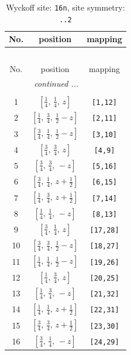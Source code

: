 \documentclass[fleqn,8pt]{jsarticle}
\begin{document}
\renewcommand{\arraystretch}{1.2}
\begin{longtable}{ccc}
\caption{Wyckoff site: {\tt 16n}, site symmetry: {\tt ..2}}
 \\
 \hline \hline
No. & position & mapping \\ \hline \endfirsthead

\multicolumn{2}{l}{\tablename\ \thetable{}} \\
 \hline \hline
No. & position & mapping \\ \hline \endhead

 \hline \hline
\multicolumn{2}{r}{\footnotesize\it continued ...} \\ \endfoot

 \hline \hline
\multicolumn{2}{r}{} \\ \endlastfoot

1 & $\left[ \frac{1}{4},\, \frac{1}{4},\, z \right]$ & {\tt [1,12]} \\ \hline
2 & $\left[ \frac{1}{4},\, \frac{3}{4},\, \frac{1}{2} - z \right]$ & {\tt [2,11]} \\ \hline
3 & $\left[ \frac{3}{4},\, \frac{1}{4},\, \frac{1}{2} - z \right]$ & {\tt [3,10]} \\ \hline
4 & $\left[ \frac{3}{4},\, \frac{3}{4},\, z \right]$ & {\tt [4,9]} \\ \hline
5 & $\left[ \frac{3}{4},\, \frac{3}{4},\, - z \right]$ & {\tt [5,16]} \\ \hline
6 & $\left[ \frac{3}{4},\, \frac{1}{4},\, z + \frac{1}{2} \right]$ & {\tt [6,15]} \\ \hline
7 & $\left[ \frac{1}{4},\, \frac{3}{4},\, z + \frac{1}{2} \right]$ & {\tt [7,14]} \\ \hline
8 & $\left[ \frac{1}{4},\, \frac{1}{4},\, - z \right]$ & {\tt [8,13]} \\ \hline
9 & $\left[ \frac{3}{4},\, \frac{1}{4},\, z \right]$ & {\tt [17,28]} \\ \hline
10 & $\left[ \frac{3}{4},\, \frac{3}{4},\, \frac{1}{2} - z \right]$ & {\tt [18,27]} \\ \hline
11 & $\left[ \frac{1}{4},\, \frac{1}{4},\, \frac{1}{2} - z \right]$ & {\tt [19,26]} \\ \hline
12 & $\left[ \frac{1}{4},\, \frac{3}{4},\, z \right]$ & {\tt [20,25]} \\ \hline
13 & $\left[ \frac{1}{4},\, \frac{3}{4},\, - z \right]$ & {\tt [21,32]} \\ \hline
14 & $\left[ \frac{1}{4},\, \frac{1}{4},\, z + \frac{1}{2} \right]$ & {\tt [22,31]} \\ \hline
15 & $\left[ \frac{3}{4},\, \frac{3}{4},\, z + \frac{1}{2} \right]$ & {\tt [23,30]} \\ \hline
16 & $\left[ \frac{3}{4},\, \frac{1}{4},\, - z \right]$ & {\tt [24,29]} \\
\end{longtable}
\end{document}
